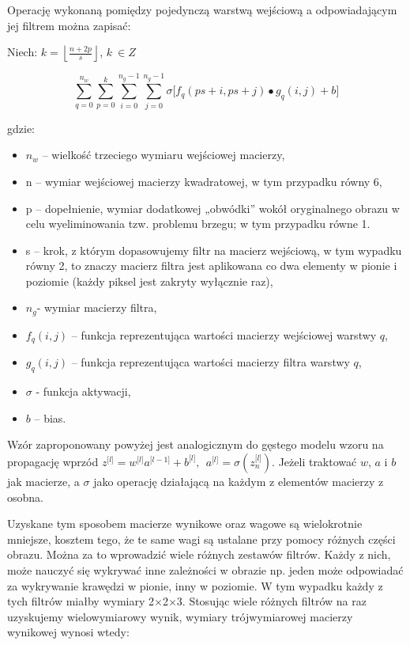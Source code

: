 Operację wykonaną pomiędzy pojedynczą warstwą wejściową a odpowiadającym jej filtrem można zapisać:

Niech: \(k = \left\lfloor \frac{n + 2p}{s} \right\rfloor\), \(k\ \in Z\)

\[\sum_{q = 0}^{n_{w}}{\sum_{p = 0}^{k}{\sum_{i = 0}^{n_{g} - 1}{\sum_{j = 0}^{n_{g} - 1}{\sigma\lbrack f_{q}\left( ps + i,ps + j \right) \bullet g_{q}\left( i,j \right) + b\rbrack}}}}\]

gdzie:

\begin{itemize}
\item
  \(n_{w}\) -- wielkość trzeciego wymiaru wejściowej macierzy,
\item
  n -- wymiar wejściowej macierzy kwadratowej, w tym przypadku równy 6,
\item
  p -- dopełnienie, wymiar dodatkowej „obwódki'' wokół oryginalnego
  obrazu w celu wyeliminowania tzw. problemu brzegu; w tym przypadku
  równe 1.
\item
  s -- krok, z którym dopasowujemy filtr na macierz wejściową, w tym
  wypadku równy 2, to znaczy macierz filtra jest aplikowana co dwa
  elementy w pionie i poziomie (każdy piksel jest zakryty wyłącznie
  raz),
\item
  \(n_{g}\)- wymiar macierzy filtra,
\item
  \(f_{q}(i,j)\) -- funkcja reprezentująca wartości macierzy wejściowej
  warstwy \(q\),
\item
  \(g_{q}(i,j)\) -- funkcja reprezentująca wartości macierzy filtra
  warstwy \(q\),
\item
  \(\sigma\) - funkcja aktywacji,
\item
  \(b\) -- bias.
\end{itemize}

Wzór zaproponowany powyżej jest analogicznym do gęstego modelu wzoru na
propagację wprzód \(z^{\lbrack l\rbrack} = w^{\lbrack l\rbrack}a^{\lbrack l - 1\rbrack} + b^{\lbrack l\rbrack},\ \ a^{\lbrack l\rbrack} = \sigma(z_{n}^{\lbrack l\rbrack})\). Jeżeli traktować \(w\), \(a\) i \(b\) jak macierze, a \(\sigma\) jako operację działającą na każdym z elementów macierzy z osobna.

Uzyskane tym sposobem macierze wynikowe oraz wagowe są wielokrotnie mniejsze, kosztem tego, że te same wagi są ustalane przy pomocy różnych części obrazu. Można za to wprowadzić wiele różnych zestawów filtrów. Każdy z nich, może nauczyć się wykrywać inne zależności w obrazie np. jeden może odpowiadać za wykrywanie krawędzi w pionie, inny w poziomie. W tym wypadku każdy z tych filtrów miałby wymiary 2\(\times\)2\(\times\)3. Stosując wiele różnych filtrów na raz uzyskujemy wielowymiarowy wynik,
wymiary trójwymiarowej macierzy wynikowej wynosi wtedy:

